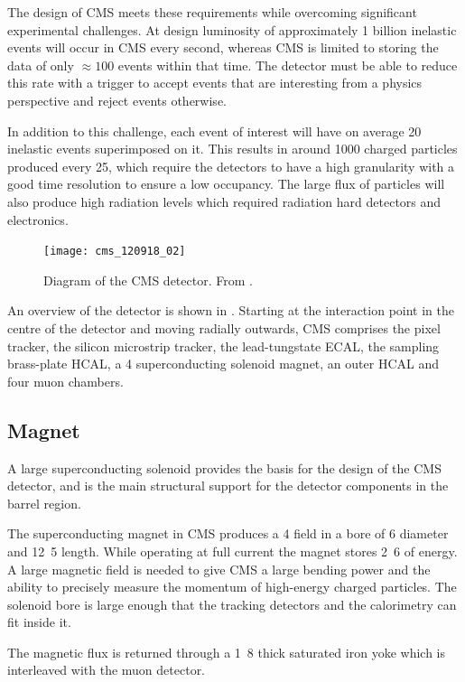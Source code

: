 The design of CMS meets these requirements while overcoming significant
experimental challenges.  At design luminosity of approximately 1 billion
inelastic events will occur in CMS every second, whereas CMS is limited to
storing the data of only $\approx 100 $ events within that time.  The detector
must be able to reduce this rate with a trigger to accept events that are
interesting from a physics perspective and reject events otherwise.

In addition to this challenge, each event of interest will have on average 20
inelastic events superimposed on it. This results in around 1000 charged
particles produced every \unit{25}{\ns}, which require the detectors to
have a high granularity with a good time resolution to ensure a low occupancy.
The large flux of particles will also produce high radiation levels which 
required radiation hard detectors and electronics.

\begin{figure}[htbp]
  \centering
  \texttt{[image: cms\_120918\_02]}
  \caption{Diagram of the CMS detector. From \cite{SketchUpCMSGallery}.}
  \label{fig:CMSnc}
\end{figure}

An overview of the detector is shown in .  Starting at the
interaction point in the centre of the detector and moving radially outwards,
CMS comprises the pixel tracker, the silicon microstrip tracker, the
lead-tungstate ECAL, the sampling brass-plate HCAL, a \unit{4}{\tesla}
superconducting solenoid magnet, an outer HCAL and four muon chambers.

\subsection{Magnet}
A large superconducting solenoid provides the basis for the design of the CMS
detector, and is the main structural support for the detector components in the
barrel region.

The superconducting magnet in CMS produces a \unit{4}{\tesla} field in a bore of
\unit{6}{\meter} diameter and \unit{12.5}{\meter} length.  While operating at
full current the magnet stores \unit{2.6}{\giga\joule} of energy.  A large
magnetic field is needed to give CMS a large bending power and the ability to
precisely measure the momentum of high-energy charged particles.  The solenoid
bore is large enough that the tracking detectors and the calorimetry can fit
inside it\cite{chatrchyan2008cms}.

The magnetic flux is returned through a \unit{1.8}{\meter} thick saturated iron
yoke which is interleaved with the muon detector.

